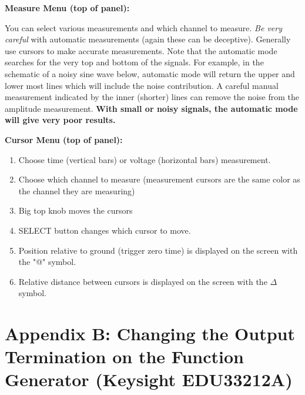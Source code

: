 \documentclass[
]{article}
\begin{document}
\textbf{Measure Menu (top of panel):}

You can select various measurements and which channel to measure.
\emph{Be very careful} with automatic measurements (again these can be
deceptive). Generally use cursors to make accurate measurements. Note
that the automatic mode searches for the very top and bottom of the
signals. For example, in the schematic of a noisy sine wave below,
automatic mode will return the upper and lower most lines which will
include the noise contribution. A careful manual measurement indicated
by the inner (shorter) lines can remove the noise from the amplitude
measurement. \textbf{With small or noisy signals, the automatic mode
will give very poor results.}

\textbf{Cursor Menu (top of panel):}

\begin{enumerate}
\def\labelenumi{\arabic{enumi}.}
\item
  Choose time (vertical bars) or voltage (horizontal bars) measurement.
\item
  Choose which channel to measure (measurement cursors are the same
  color as the channel they are measuring)
\item
  Big top knob moves the cursors
\item
  SELECT button changes which cursor to move.
\item
  Position relative to ground (trigger zero time) is displayed on the
  screen with the "@" symbol.
\item
  Relative distance between cursors is displayed on the screen with the
  \(\Delta\) symbol.
\end{enumerate}

\hypertarget{appendix-b-changing-the-output-termination-on-the-function-generator-keysight-edu33212a}{%
\section*{Appendix B: Changing the Output Termination on the Function
Generator (Keysight
EDU33212A)}\label{appendix-b-changing-the-output-termination-on-the-function-generator-keysight-edu33212a}}
\end{document}
